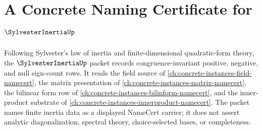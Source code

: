 \chapter{A Concrete Naming Certificate for $\SylvesterInertiaUp$}
\label{ch:concrete-instances-sylvester-inertia-namecert}

Following Sylvester's law of inertia and finite-dimensional quadratic-form theory, the $\SylvesterInertiaUp$ packet records congruence-invariant positive, negative, and null sign-count rows. It reads the field source of \autoref{ch:concrete-instances-field-namecert}, the matrix presentation of \autoref{ch:concrete-instances-matrix-namecert}, the bilinear form row of \autoref{ch:concrete-instances-bilinform-namecert}, and the inner-product substrate of \autoref{ch:concrete-instances-innerproduct-namecert}. The packet names finite inertia data as a displayed NameCert carrier; it does not assert analytic diagonalization, spectral theory, choice-selected bases, or completeness.

